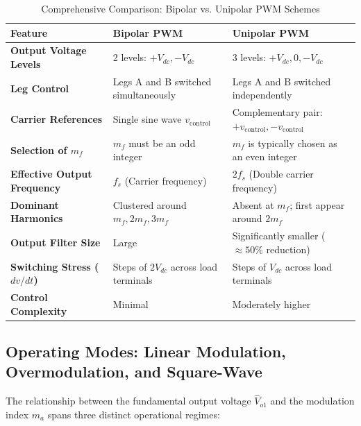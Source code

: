 \documentclass[11pt,a4paper]{article}
\begin{document}
\begin{table}[htbp]
\centering
\small
\caption{Comprehensive Comparison: Bipolar vs. Unipolar PWM Schemes}
\label{tab:bipolar_vs_unipolar}
\begin{tabularx}{\textwidth}{l X X}
\toprule
\textbf{Feature} & \textbf{Bipolar PWM} & \textbf{Unipolar PWM} \\
\midrule
\textbf{Output Voltage Levels} & 2 levels: $+V_{dc}, -V_{dc}$ & 3 levels: $+V_{dc}, 0, -V_{dc}$ \\
\textbf{Leg Control} & Legs A and B switched simultaneously & Legs A and B switched independently \\
\textbf{Carrier References} & Single sine wave $v_{\text{control}}$ & Complementary pair: $+v_{\text{control}}, -v_{\text{control}}$ \\
\textbf{Selection of $m_f$} & $m_f$ must be an odd integer & $m_f$ is typically chosen as an even integer \\
\textbf{Effective Output Frequency} & $f_s$ (Carrier frequency) & $2f_s$ (Double carrier frequency) \\
\textbf{Dominant Harmonics} & Clustered around $m_f, 2m_f, 3m_f$ & Absent at $m_f$; first appear around $2m_f$ \\
\textbf{Output Filter Size} & Large & Significantly smaller ($\approx 50\%$ reduction) \\
\textbf{Switching Stress ($dv/dt$)} & Steps of $2V_{dc}$ across load terminals & Steps of $V_{dc}$ across load terminals \\
\textbf{Control Complexity} & Minimal & Moderately higher \\
\bottomrule
\end{tabularx}
\end{table}

\subsection{Operating Modes: Linear Modulation, Overmodulation, and Square-Wave}

The relationship between the fundamental output voltage $\hat{V}_{o1}$ and the modulation index $m_a$ spans three distinct operational regimes:
\end{document}
